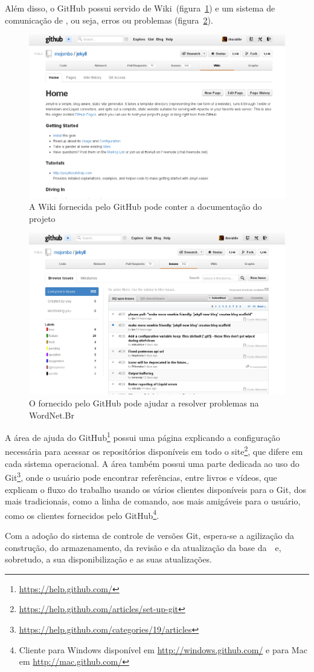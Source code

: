 Além disso, o GitHub possui servido de Wiki~(figura~\ref{github:wiki}) e um
sistema de comunicação de , ou seja, erros ou problemas
(figura~\ref{github:bugtracker}).

\begin{figure}[h]
  \centering
  \includegraphics[width=.9\textwidth]{img/wiki.png}
  \caption{A Wiki fornecida pelo GitHub pode conter a documentação do projeto}
  \label{github:wiki}
\end{figure}

\begin{figure}[h]
  \centering
  \includegraphics[width=.9\textwidth]{img/bugtracker.png}
  \caption{O  fornecido pelo GitHub pode ajudar a resolver problemas na WordNet.Br}
  \label{github:bugtracker}
\end{figure}

A área de ajuda do GitHub\footnote{\url{https://help.github.com/}} possui uma
página explicando a configuração necessária para acessar os repositórios
disponíveis em todo o
site\footnote{\url{https://help.github.com/articles/set-up-git}}, que difere em
cada sistema operacional. A área também possui uma parte dedicada ao uso do
Git\footnote{\url{https://help.github.com/categories/19/articles}}, onde o
usuário pode encontrar referências, entre livros e vídeos, que explicam o fluxo
do trabalho usando os vários clientes disponíveis para o Git, dos mais
tradicionais, como a linha de comando, aos mais amigáveis para o usuário, como
os clientes fornecidos pelo GitHub\footnote{Cliente para Windows disponível em
\url{http://windows.github.com/} e para Mac em \url{http://mac.github.com/}}.

Com a adoção do sistema de controle de versões Git, espera-se a agilização da
construção, do armazenamento, da revisão e da atualização da base da~\wnbr\ e,
sobretudo, a sua disponibilização e as suas atualizações.
